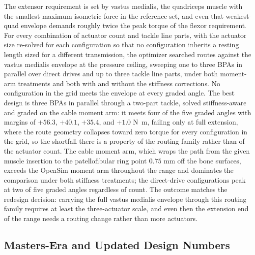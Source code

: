 The extensor requirement is set by vastus medialis, the quadriceps muscle with the smallest maximum isometric force in the reference set, and even that weakest-quad envelope demands roughly twice the peak torque of the flexor requirement. For every combination of actuator count and tackle line parts, with the actuator size re-solved for each configuration so that no configuration inherits a resting length sized for a different transmission, the optimizer searched routes against the vastus medialis envelope at the pressure ceiling, sweeping one to three BPAs in parallel over direct drives and up to three tackle line parts, under both moment-arm treatments and both with and without the stiffness corrections. No configuration in the grid meets the envelope at every graded angle. The best design is three BPAs in parallel through a two-part tackle, solved stiffness-aware and graded on the cable moment arm: it meets four of the five graded angles with margins of $+56.3$, $+40.1$, $+35.4$, and $+1.0$ \unit{\newton\meter}, failing only at full extension, where the route geometry collapses toward zero torque for every configuration in the grid, so the shortfall there is a property of the routing family rather than of the actuator count. The cable moment arm, which wraps the path from the given muscle insertion to the patellofibular ring point $0.75$ \unit{\milli\metre} off the bone surfaces, exceeds the OpenSim moment arm throughout the range and dominates the comparison under both stiffness treatments; the direct-drive configurations peak at two of five graded angles regardless of count. The outcome matches the redesign decision: carrying the full vastus medialis envelope through this routing family requires at least the three-actuator scale, and even then the extension end of the range needs a routing change rather than more actuators.

\subsection{Masters-Era and Updated Design Numbers}\label{sec:masters_updated}

